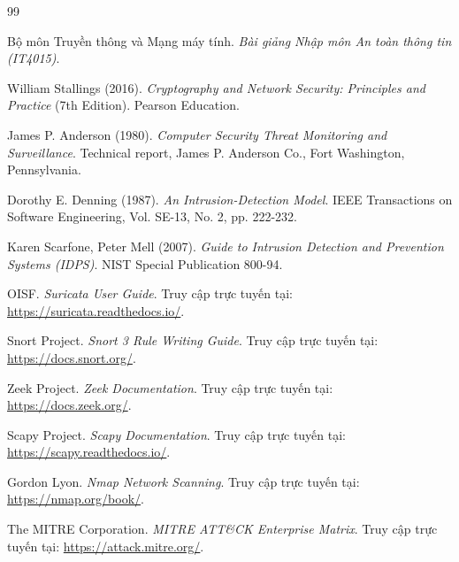 \renewcommand{\bibname}{Tài liệu tham khảo}
\cleardoublepage
{} %
\begin{thebibliography}{99}

Bộ môn Truyền thông và Mạng máy tính. \textit{Bài giảng Nhập môn An toàn thông tin (IT4015)}.

William Stallings (2016). \textit{Cryptography and Network Security: Principles and Practice} (7th Edition). Pearson Education.

James P. Anderson (1980). \textit{Computer Security Threat Monitoring and Surveillance}. Technical report, James P. Anderson Co., Fort Washington, Pennsylvania.

Dorothy E. Denning (1987). \textit{An Intrusion-Detection Model}. IEEE Transactions on Software Engineering, Vol. SE-13, No. 2, pp. 222-232.

Karen Scarfone, Peter Mell (2007). \textit{Guide to Intrusion Detection and Prevention Systems (IDPS)}. NIST Special Publication 800-94.

OISF. \textit{Suricata User Guide}. Truy cập trực tuyến tại: \url{https://suricata.readthedocs.io/}.

Snort Project. \textit{Snort 3 Rule Writing Guide}. Truy cập trực tuyến tại: \url{https://docs.snort.org/}.

Zeek Project. \textit{Zeek Documentation}. Truy cập trực tuyến tại: \url{https://docs.zeek.org/}.

Scapy Project. \textit{Scapy Documentation}. Truy cập trực tuyến tại: \url{https://scapy.readthedocs.io/}.

Gordon Lyon. \textit{Nmap Network Scanning}. Truy cập trực tuyến tại: \url{https://nmap.org/book/}.

The MITRE Corporation. \textit{MITRE ATT\&CK Enterprise Matrix}. Truy cập trực tuyến tại: \url{https://attack.mitre.org/}.

\end{thebibliography}
